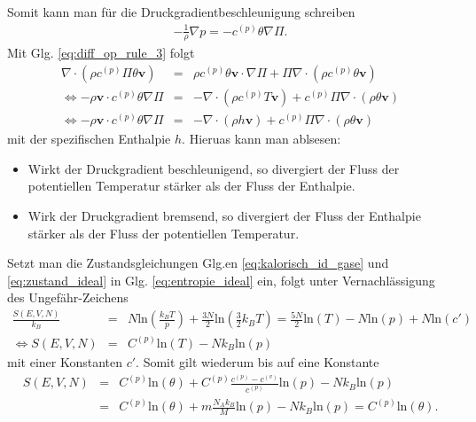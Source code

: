 \documentclass{book}
\renewcommand{\ln}{\text{ln}}
\begin{document}
%
Somit kann man für die Druckgradientbeschleunigung schreiben
%
\begin{eqnarray}
-\frac{1}{\rho}\nabla p = -c^{(p)}\theta\nabla\Pi.\label{eq:exner_pressure_gradient_acc}
\end{eqnarray}
%
Mit Glg. \eqref{eq:diff_op_rule_3} folgt
%
\begin{eqnarray}
\nabla\cdot\left(\rho c^{(p)}\Pi\theta\mathbf{v}\right) & = & \rho c^{(p)}\theta\mathbf{v}\cdot\nabla\Pi + \Pi\nabla\cdot\left(\rho c^{(p)}\theta\mathbf{v}\right)\nonumber\\
\Leftrightarrow -\rho\mathbf{v}\cdot c^{(p)}\theta\nabla\Pi & = & -\nabla\cdot\left(\rho c^{(p)}T\mathbf{v}\right) +  c^{(p)}\Pi\nabla\cdot\left(\rho\theta\mathbf{v}\right)\nonumber\\
\Leftrightarrow -\rho\mathbf{v}\cdot c^{(p)}\theta\nabla\Pi & = & -\nabla\cdot\left(\rho h\mathbf{v}\right) + c^{(p)}\Pi\nabla\cdot\left(\rho\theta\mathbf{v}\right)\
\end{eqnarray}
%
mit der spezifischen Enthalpie $h$. Hieruas kann man ablsesen:
%
\begin{itemize}
\item Wirkt der Druckgradient beschleunigend, so divergiert der Fluss der potentiellen Temperatur stärker als der Fluss der Enthalpie.
\item Wirk der Druckgradient bremsend, so divergiert der Fluss der Enthalpie stärker als der Fluss der potentiellen Temperatur.
\end{itemize}
%
Setzt man die Zustandsgleichungen Glg.en \eqref{eq:kalorisch_id_gase} und \eqref{eq:zustand_ideal} in Glg. \eqref{eq:entropie_ideal} ein, folgt unter Vernachlässigung des Ungefähr-Zeichens
%
\begin{eqnarray}
\frac{S\left(E, V, N\right)}{k_B} & = & N\ln\left(\frac{k_BT}{p}\right) + \frac{3N}{2}\ln\left(\frac{3}{2}k_BT\right) = \frac{5N}{2}\ln\left(T\right) - N\ln\left(p\right) + N\ln\left(c'\right)\nonumber\\
\Leftrightarrow S\left(E, V, N\right) & = & C^{(p)}\ln\left(T\right) - Nk_B\ln\left(p\right)
\end{eqnarray}
%
mit einer Konstanten $c'$. Somit gilt wiederum bis auf eine Konstante
%
\begin{eqnarray}
S\left(E, V, N\right) & = & C^{(p)}\ln\left(\theta\right) + C^{(p)}\frac{c^{(p)} - c^{(v)}}{c^{(p)}}\ln\left(p\right) - Nk_B\ln\left(p\right)\nonumber\\
& = & C^{(p)}\ln\left(\theta\right) + m\frac{N_Ak_B}{M}\ln\left(p\right) - Nk_B\ln\left(p\right) = C^{(p)}\ln\left(\theta\right).
\end{eqnarray}
\end{document}
